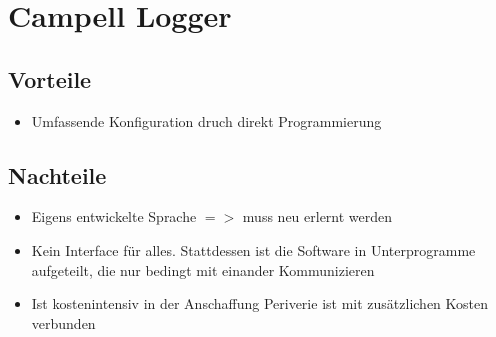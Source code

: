\section{Campell Logger}

\subsection{Vorteile}
\begin{itemize}
 \item Umfassende Konfiguration druch direkt Programmierung
\end{itemize}


\subsection{Nachteile}
\begin{itemize}
 \item Eigens entwickelte Sprache $=>$ muss neu erlernt werden
 \item Kein Interface für alles.
 \subitem Stattdessen ist die Software in Unterprogramme aufgeteilt, die nur 
bedingt mit einander Kommunizieren
 \item Ist kostenintensiv in der Anschaffung
 \subitem Periverie ist mit zusätzlichen Kosten verbunden
\end{itemize}

